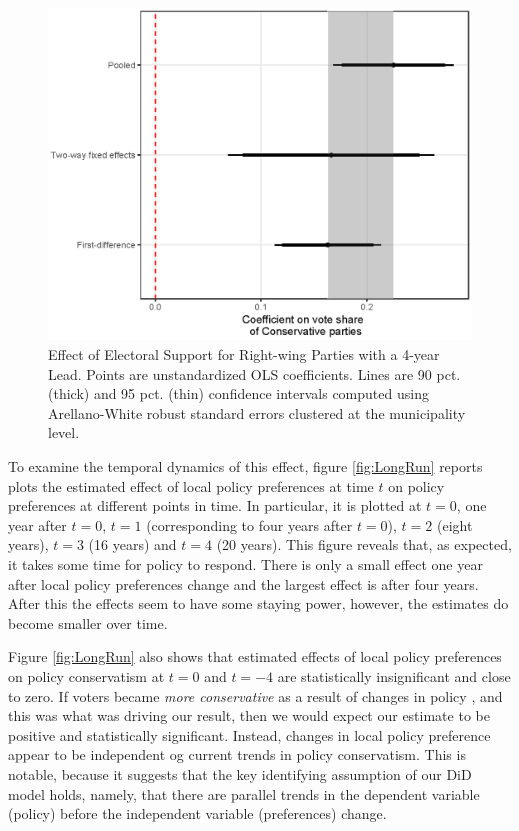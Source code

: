 \documentclass[a4paper,12pt]{article}
\begin{document}
\begin{figure}[h]
	\centering
	\includegraphics[scale = 0.8]{Newest_ggplot_coef.eps}
	\caption{Effect of Electoral Support for Right-wing Parties with a 4-year Lead. Points are unstandardized OLS coefficients. Lines are 90 pct. (thick) and 95 pct. (thin) confidence intervals computed using Arellano-White robust standard errors clustered at the municipality level.}
	\label{fig:FourYearLead}
\end{figure}


To examine the temporal dynamics of this effect, figure \ref{fig:LongRun} reports plots the estimated effect of local policy preferences at time $t$ on policy preferences at different points in time. In particular, it is plotted at $t=0$, one year after $t=0$, $t=1$ (corresponding to four years after $t=0$), $t=2$ (eight years), $t=3$ (16 years) and $t=4$ (20 years). This figure reveals that, as expected, it takes some time for policy to respond. There is only a small effect one year after local policy preferences change and the largest effect is  after four years. After this the effects seem to have some staying power, however, the estimates do become smaller over time.

Figure \ref{fig:LongRun} also shows that estimated effects of local policy preferences on policy conservatism at $t=0$ and $t=-4$ are statistically insignificant and close to zero. If voters became \emph{more conservative} as a result of changes in policy \cite[cf.]{lenz2013follow,slothuus2010can}, and this was what was driving our result, then we would expect our estimate to be positive and statistically significant. Instead, changes in local policy preference appear to be independent og current trends in policy conservatism. This is notable, because it suggests that the key identifying assumption of our DiD model holds, namely, that there are parallel trends in the dependent variable (policy) before the independent variable (preferences) change.
\end{document}
